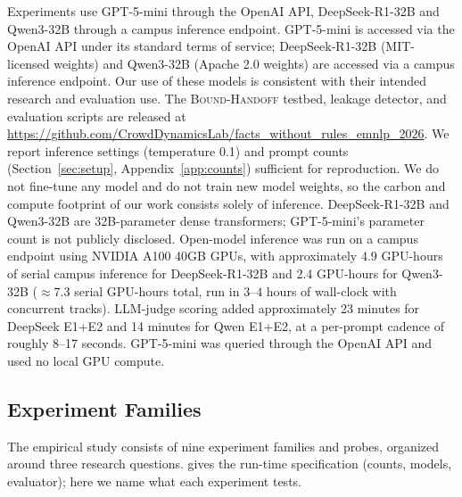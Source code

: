 Experiments use GPT-5-mini through the OpenAI API, DeepSeek-R1-32B and Qwen3-32B through a campus inference endpoint. GPT-5-mini is accessed via the OpenAI API under its standard terms of service; DeepSeek-R1-32B (MIT-licensed weights) and Qwen3-32B (Apache 2.0 weights) are accessed via a campus inference endpoint. Our use of these models is consistent with their intended research and evaluation use. The \textsc{Bound-Handoff} testbed, leakage detector, and evaluation scripts are released at \url{https://github.com/CrowdDynamicsLab/facts_without_rules_emnlp_2026}. We report inference settings (temperature 0.1) and prompt counts (Section~\ref{sec:setup}, Appendix~\ref{app:counts}) sufficient for reproduction. We do not fine-tune any model and do not train new model weights, so the carbon and compute footprint of our work consists solely of inference. DeepSeek-R1-32B and Qwen3-32B are 32B-parameter dense transformers; GPT-5-mini's parameter count is not publicly disclosed. Open-model inference was run on a campus endpoint using NVIDIA A100 40GB GPUs, with approximately 4.9 GPU-hours of serial campus inference for DeepSeek-R1-32B and 2.4 GPU-hours for Qwen3-32B ($\approx 7.3$ serial GPU-hours total, run in $3$--$4$ hours of wall-clock with concurrent tracks). LLM-judge scoring added approximately 23 minutes for DeepSeek E1+E2 and 14 minutes for Qwen E1+E2, at a per-prompt cadence of roughly 8--17 seconds. GPT-5-mini was queried through the OpenAI API and used no local GPU compute.

\subsection{Experiment Families}
\label{app:experiments_family}
The empirical study consists of nine experiment families and probes, organized around three research questions.  gives the run-time specification (counts, models, evaluator); here we name what each experiment tests.
 
